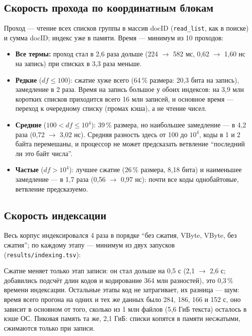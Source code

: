 \subsection{Скорость прохода по координатным блокам}
Проход --- чтение всех списков группы в массив docID (\texttt{read\_list}, как в поиске) и сумма docID; индекс уже в памяти. Время --- минимум из 10 проходов:
\begin{center}
\footnotesize
\setlength{\tabcolsep}{4pt}

\end{center}
\begin{itemize}
    \item \textbf{Все термы:} проход стал в 2,6 раза дольше (224 $\to$ 582 мс, 0,62 $\to$ 1,60 нс на запись) при списках в 3,3 раза меньше.
    \item \textbf{Редкие} ($df \le 100$): сжатие хуже всего (64\,\% размера: 20,3 бита на запись), замедление в 2 раза. Время на запись большое у обоих индексов: на 3,9 млн коротких списков приходится всего 16 млн записей, и основное время --- переход к очередному списку (промах кэша), а не чтение чисел.
    \item \textbf{Средние} ($100 < df \le 10^4$): 39\,\% размера, но наибольшее замедление --- в 4,2 раза (0,72 $\to$ 3,02 нс). Средняя разность здесь от 100 до $10^4$, коды в 1 и 2 байта перемешаны, и процессор не может предсказать ветвление \enquote{последний ли это байт числа}.
    \item \textbf{Частые} ($df > 10^4$): лучшее сжатие (26\,\% размера, 8,18 бита) и наименьшее замедление --- в 1,7 раза (0,56 $\to$ 0,97 нс): почти все коды однобайтовые, ветвление предсказуемо.
\end{itemize}

\subsection{Скорость индексации}
Весь корпус индексировался 4 раза в порядке \enquote{без сжатия, VByte, VByte, без сжатия}; по каждому этапу --- минимум из двух запусков (\texttt{results/indexing.tsv}):
\begin{center}
\small

\end{center}
Сжатие меняет только этап записи: он стал дольше на 0,5 с (2,1 $\to$ 2,6 с; добавились подсчёт длин кодов и кодирование 364 млн разностей), это 0,3\,\% времени индексации. Остальные этапы код не затрагивает, их разница --- шум: время всего прогона на одних и тех же данных было 284, 186, 166 и 152 с, оно зависит в основном от того, сколько из 1 млн файлов (5,6 ГиБ текста) осталось в кэше ОС. Пиковая память та же, 2,1 ГиБ: списки копятся в памяти несжатыми, сжимаются только при записи.

